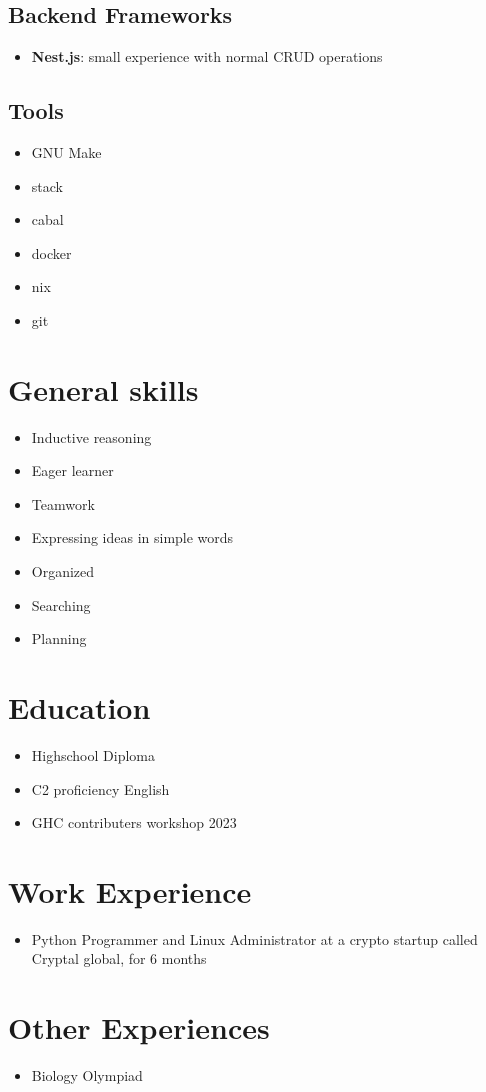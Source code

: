 \documentclass{article}
\begin{document}
\subsection{Backend Frameworks}
\begin{itemize}

    \item \textbf{Nest.js}: small experience with normal CRUD operations

\end{itemize}

\subsection{Tools}

\begin{itemize}
    \item GNU Make 
    \item stack
    \item cabal
    \item docker
    \item nix
    \item git
\end{itemize}

\section{General skills} 

\begin{itemize}

    \item Inductive reasoning
    \item Eager learner
    \item Teamwork
    \item Expressing ideas in simple words
    \item Organized 
    \item Searching
    \item Planning

\end{itemize}

\section{Education}

\begin{itemize}
    \item Highschool Diploma
    \item C2 proficiency English
    \item GHC contributers workshop 2023
\end{itemize}

\section{Work Experience}
\begin{itemize}
      \item Python Programmer and Linux Administrator at a crypto startup called Cryptal global, for 6 months
\end{itemize}

\section{Other Experiences}
\begin{itemize}
        \item Biology Olympiad
\end{itemize}
\end{document}
